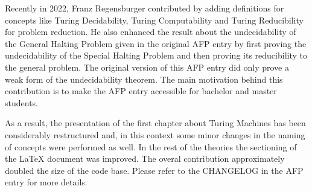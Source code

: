 \documentclass{report}
\begin{document}
Recently in 2022, Franz Regensburger contributed by adding definitions for
concepts like Turing Decidability, Turing Computability and Turing Reducibility
for problem reduction. He also enhanced the result about the
undecidability of the General Halting Problem given in the original AFP entry
by first proving the undecidability of the Special Halting Problem and then
proving its reducibility to the general problem. The original version of this
AFP entry did only prove a weak form of the undecidability theorem.
The main motivation behind this contribution is to make the AFP entry
accessible for bachelor and master students.

As a result, the presentation of the first chapter about Turing
Machines has been considerably restructured and, in this context some minor
changes in the naming of concepts were performed as well. In the rest of the theories
the sectioning of the \LaTeX{} document was improved.
The overal contribution approximately doubled the size of the code base.
Please refer to the CHANGELOG in the AFP entry for more details.





\end{document}
